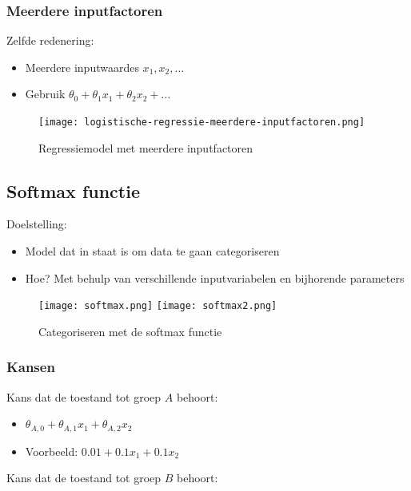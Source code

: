 \documentclass{article}
\begin{document}
\subsubsection{Meerdere inputfactoren}

Zelfde redenering:

\begin{itemize}
    \item Meerdere inputwaardes $x_1, x_2, \dots$
    \item Gebruik $\theta_0 + \theta_1x_1 + \theta_2x_2 + \dots$
\end{itemize}

\begin{figure}[H]
    \centering
    \texttt{[image: logistische-regressie-meerdere-inputfactoren.png]}
    \caption{Regressiemodel met meerdere inputfactoren}
\end{figure}


\subsection{Softmax functie}

Doelstelling:

\begin{itemize}
    \item Model dat in staat is om data te gaan categoriseren
    \item Hoe? Met behulp van verschillende inputvariabelen en bijhorende parameters 
\end{itemize}

\begin{figure}[H]
    \centering
    \texttt{[image: softmax.png]}
    \texttt{[image: softmax2.png]}
    \caption{Categoriseren met de softmax functie}
\end{figure}

\subsubsection{Kansen}

Kans dat de toestand tot groep $A$ behoort:

\begin{itemize}
    \item $\theta_{A,0} + \theta_{A,1}x_1 + \theta_{A,2}x_2$
    \item Voorbeeld: $0.01 + 0.1x_1 + 0.1x_2$
\end{itemize}

Kans dat de toestand tot groep $B$ behoort:
\end{document}

